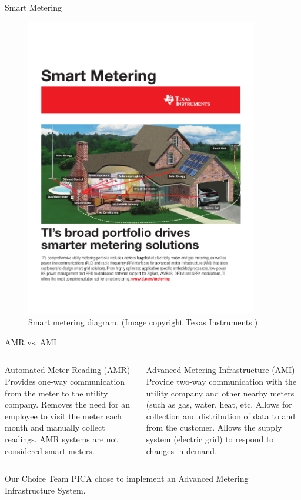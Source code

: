 \documentclass{beamer}
\begin{document}
\begin{frame}{Smart Metering}
	\begin{figure}
	\begin{center}
	\includegraphics[width=4in]{includes/TI_smart_meter_picture}
	\caption{Smart metering diagram. {\footnotesize(Image copyright Texas Instruments.)}}
	\label{fig:smart_metering}
	\end{center}
	\end{figure}
\end{frame}

\begin{frame}{AMR vs. AMI}
	\begin{columns}[t]
			\begin{block}{\footnotesize{Automated Meter Reading (AMR)}}
				{\footnotesize Provides one-way communication from the meter to the utility company. Removes the need for an employee to visit the meter each month and manually collect readings. AMR systems are not considered smart meters.}
			\end{block}\pause
			\begin{block}{\footnotesize{Advanced Metering Infrastructure (AMI)}}
				{\footnotesize Provide two-way communication with the utility company and other nearby meters (such as gas, water, heat, etc. Allows for collection and distribution of data to and from the customer. Allows the supply system (electric grid) to respond to changes in demand.}
			\end{block}\pause
	\end{columns}
	\begin{alertblock}{Our Choice}
		Team PICA chose to implement an Advanced Metering Infrastructure System.
	\end{alertblock}
\end{frame}
\end{document}

